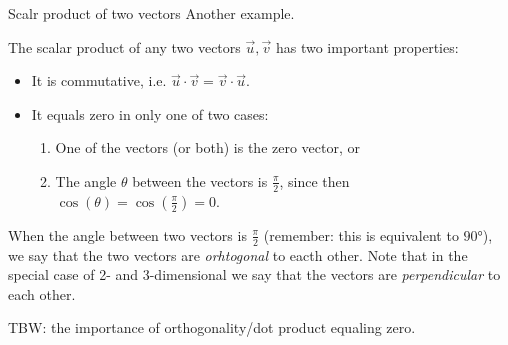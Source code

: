 \begin{example}{Scalr product of two vectors}{}
	Another example.
\end{example}

The scalar product of any two vectors $\vec{u},\vec{v}$ has two important properties:
\begin{itemize}
	\item It is commutative, i.e. $\vec{u}\cdot\vec{v} = \vec{v}\cdot\vec{u}$.
	\item It equals zero in only one of two cases:
		\begin{enumerate}
			\item One of the vectors (or both) is the zero vector, or
			\item The angle $\theta$ between the vectors is $\frac{\pi}{2}$, since then $\cos(\theta)=\cos\left(\frac{\pi}{2}\right)=0$.
		\end{enumerate}
\end{itemize}

When the angle between two vectors is $\frac{\pi}{2}$ (remember: this is equivalent to $\ang{90}$), we say that the two vectors are \emph{orhtogonal} to eacth other. Note that in the special case of 2- and 3-dimensional we say that the vectors are \emph{perpendicular} to each other.

TBW: the importance of orthogonality/dot product equaling zero.

\Blindtext
